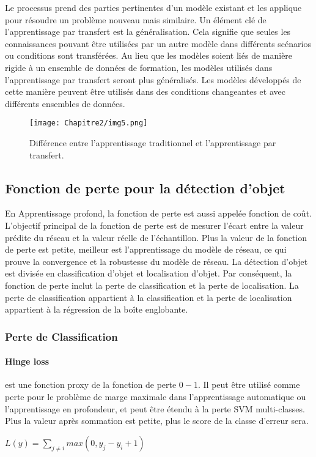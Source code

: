      Le processus prend des parties pertinentes d'un modèle existant et les applique pour résoudre un problème nouveau mais similaire. Un élément clé de l'apprentissage par transfert est la généralisation. Cela signifie que seules les connaissances pouvant être utilisées par un autre modèle dans différents scénarios ou conditions sont transférées. Au lieu que les modèles soient liés de manière rigide à un ensemble de données de formation, les modèles utilisés dans l'apprentissage par transfert seront plus généralisés. Les modèles développés de cette manière peuvent être utilisés dans des conditions changeantes et avec différents ensembles de données.
     \begin{figure}[H]
          \centering
          \texttt{[image: Chapitre2/img5.png]}
          \caption{Différence entre l'apprentissage traditionnel et l'apprentissage par transfert.}
          \label{img5}
          \end{figure}

     \subsection{Fonction de perte pour la détection d'objet}
     En Apprentissage profond, la fonction de perte est aussi appelée fonction de coût. L'objectif principal de la fonction de perte est de mesurer l'écart entre la valeur prédite du réseau et la valeur réelle de l'échantillon. Plus la valeur de la fonction de perte est petite, meilleur est l'apprentissage du modèle de réseau, ce qui prouve la convergence et la robustesse du modèle de réseau. La détection d'objet est divisée en classification d'objet et localisation d'objet. Par conséquent, la fonction de perte inclut la perte de classification et la perte de localisation. La perte de classification appartient à la classification et la perte de localisation appartient à la régression de la boîte englobante.

     \subsubsection{Perte de Classification}
          \paragraph{Hinge loss}
          est une fonction proxy de la fonction de perte $0-1$. Il peut être utilisé comme perte pour le problème de marge maximale dans l'apprentissage automatique ou l'apprentissage en profondeur, et peut être étendu à la perte SVM multi-classes. Plus la valeur après sommation est petite, plus le score de la classe d'erreur sera.
          \begin{center} $L(y)=\sum_{j \neq i}max(0,y_j-y_i+1)$ \end{center}

